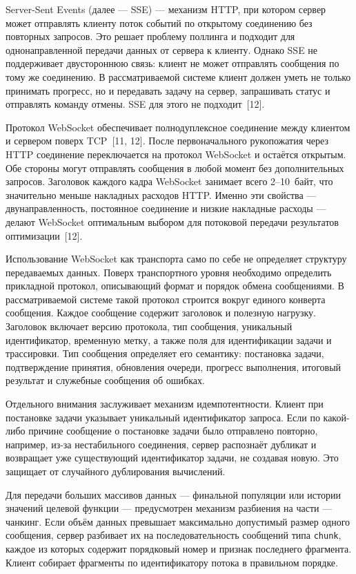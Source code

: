 \documentclass[14pt, russian]{scrartcl}
\begin{document}
Server-Sent Events (далее --- SSE) --- механизм HTTP, при котором сервер может
отправлять клиенту поток событий по открытому соединению без повторных
запросов. Это решает проблему поллинга и подходит для однонаправленной
передачи данных от сервера к клиенту. Однако SSE не поддерживает
двустороннюю связь: клиент не может отправлять сообщения по тому же
соединению. В рассматриваемой системе клиент должен уметь не только
принимать прогресс, но и передавать задачу на сервер, запрашивать статус
и отправлять команду отмены. SSE для этого не подходит~[12].

Протокол WebSocket обеспечивает полнодуплексное соединение между клиентом
и сервером поверх TCP~[11, 12]. После первоначального рукопожатия через HTTP
соединение переключается на протокол WebSocket и остаётся открытым.
Обе стороны могут отправлять сообщения в любой момент без дополнительных
запросов. Заголовок каждого кадра WebSocket занимает всего 2--10~байт,
что значительно меньше накладных расходов HTTP. Именно эти свойства ---
двунаправленность, постоянное соединение и низкие накладные расходы ---
делают WebSocket оптимальным выбором для потоковой передачи результатов
оптимизации~[12].

Использование WebSocket как транспорта само по себе не определяет
структуру передаваемых данных. Поверх транспортного уровня необходимо
определить прикладной протокол, описывающий формат и порядок обмена
сообщениями. В рассматриваемой системе такой протокол строится вокруг
единого конверта сообщения. Каждое сообщение содержит заголовок и
полезную нагрузку. Заголовок включает версию протокола, тип сообщения,
уникальный идентификатор, временную метку, а также поля для
идентификации задачи и трассировки. Тип сообщения определяет его
семантику: постановка задачи, подтверждение принятия, обновления очереди,
прогресс выполнения, итоговый результат и служебные сообщения об ошибках.

Отдельного внимания заслуживает механизм идемпотентности. Клиент при
постановке задачи указывает уникальный идентификатор запроса. Если
по какой-либо причине сообщение о постановке задачи было отправлено
повторно, например, из-за нестабильного соединения, сервер распознаёт
дубликат и возвращает уже существующий идентификатор задачи, не создавая
новую. Это защищает от случайного дублирования вычислений.

Для передачи больших массивов данных --- финальной популяции или истории
значений целевой функции --- предусмотрен механизм разбиения на части --- чанкинг. 
Если объём данных превышает максимально допустимый размер
одного сообщения, сервер разбивает их на последовательность сообщений
типа \texttt{chunk}, каждое из которых содержит порядковый номер и
признак последнего фрагмента. Клиент собирает фрагменты по идентификатору
потока в правильном порядке.
\end{document}
